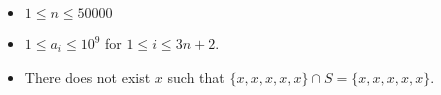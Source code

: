 \begin{itemize}
\tightlist
\item $1\le n \le 50000$
\item $1\le a_i \le 10^9$ for $1 \le i \le 3n+2$.
\item There does not exist $x$ such that $\{x,x,x,x,x\}\cap S = \{x,x,x,x,x\}$.
\end{itemize}
